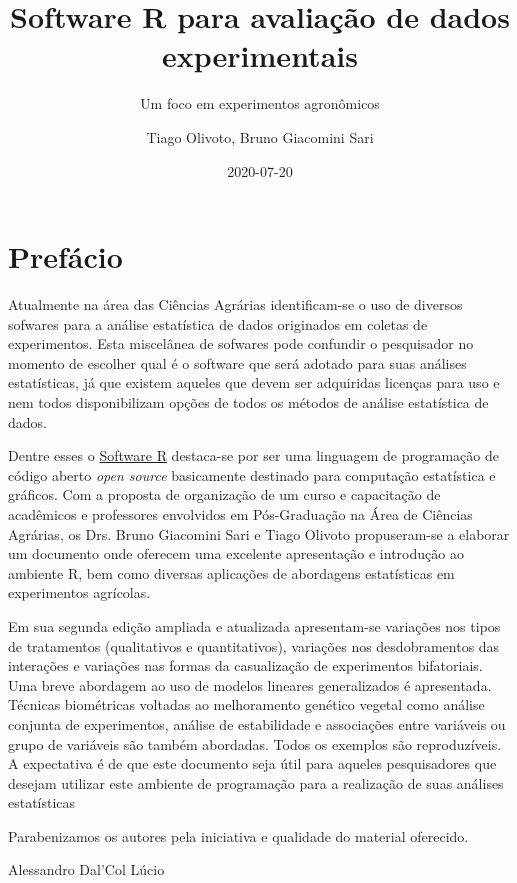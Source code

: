 \documentclass[
]{book}
\title{Software R para avaliação de dados experimentais}
\subtitle{Um foco em experimentos agronômicos}
\author{Tiago Olivoto, Bruno Giacomini Sari}
\date{2020-07-20}
\begin{document}
\maketitle

{
\setcounter{tocdepth}{1}
\tableofcontents
}
\hypertarget{prefuxe1cio}{%
\chapter*{Prefácio}\label{prefuxe1cio}}

Atualmente na área das Ciências Agrárias identificam-se o uso de diversos sofwares para a análise estatística de dados originados em coletas de experimentos. Esta miscelânea de sofwares pode confundir o pesquisador no momento de escolher qual é o software que será adotado para suas análises estatísticas, já que existem aqueles que devem ser adquiridas licenças para uso e nem todos disponibilizam opções de todos os métodos de análise estatística de dados.

Dentre esses o \href{https://www.r-project.org/}{Software R} destaca-se por ser uma linguagem de programação de código aberto \emph{open source} basicamente destinado para computação estatística e gráficos. Com a proposta de organização de um curso e capacitação de acadêmicos e professores envolvidos em Pós-Graduação na Área de Ciências Agrárias, os Drs. Bruno Giacomini Sari e Tiago Olivoto propuseram-se a elaborar um documento onde oferecem uma excelente apresentação e introdução ao ambiente R, bem como diversas aplicações de abordagens estatísticas em experimentos agrícolas.

Em sua segunda edição ampliada e atualizada apresentam-se variações nos tipos de tratamentos (qualitativos e quantitativos), variações nos desdobramentos das interações e variações nas formas da casualização de experimentos bifatoriais. Uma breve abordagem ao uso de modelos lineares generalizados é apresentada. Técnicas biométricas voltadas ao melhoramento genético vegetal como análise conjunta de experimentos, análise de estabilidade e associações entre variáveis ou grupo de variáveis são também abordadas. Todos os exemplos são reproduzíveis. A expectativa é de que este documento seja útil para aqueles pesquisadores que desejam utilizar este ambiente de programação para a realização de suas análises estatísticas

Parabenizamos os autores pela iniciativa e qualidade do material oferecido.

Alessandro Dal'Col Lúcio
\end{document}
